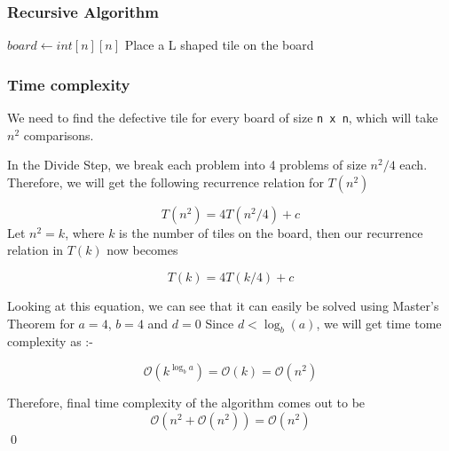 \documentclass[12pt]{article}
\begin{document}
\subsubsection{Recursive Algorithm}


\begin{algorithm}
\begin{algorithmic}[1]

\Ensure $board \leftarrow int[n][n]$
    \State Place a L shaped tile on the board
\Else

    
\EndIf 
\end{algorithmic}
\end{algorithm}

\pagebreak

\subsubsection{Time complexity}

We need to find the defective tile for every board of size \texttt{n x n}, which will take $n^2$ comparisons.

In the Divide Step, we break each problem into 4 problems of size $n^2/4$ each. Therefore, we will get the following recurrence relation for $T(n^2)$





$$T(n^2) = 4T(n^2/4) + c$$
Let $n^2 = k$, where $k$ is the number of tiles on the board, then our recurrence relation in $T(k)$ now becomes

$$T(k) = 4T(k/4) + c$$


Looking at this equation, we can see that it can easily be solved using Master's Theorem for $a = 4$, $b = 4$ and $d = 0$
Since $d < \log_b(a)$, we will get time tome complexity as  :-

$$\mathcal{O}(k^{\log_b{a}}) = \mathcal{O}(k) = \mathcal{O}(n^2)$$ 

Therefore, final time complexity of the algorithm comes out to be $$\mathcal{O}(n^2 + \mathcal{O}(n^2)) = \mathcal{O}(n^2) $$
{\qed}
\end{document}
